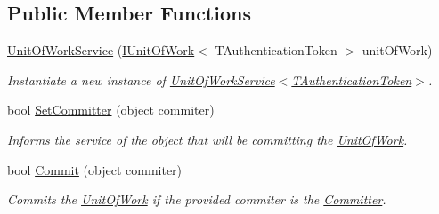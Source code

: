 \subsection*{Public Member Functions}
\begin{DoxyCompactItemize}
\item 
\hyperlink{classCqrs_1_1Services_1_1UnitOfWorkService_a187b3f612490a8316770bb7c6a9aa25f_a187b3f612490a8316770bb7c6a9aa25f}{Unit\+Of\+Work\+Service} (\hyperlink{interfaceCqrs_1_1Domain_1_1IUnitOfWork}{I\+Unit\+Of\+Work}$<$ T\+Authentication\+Token $>$ unit\+Of\+Work)
\begin{DoxyCompactList}\small\item\em Instantiate a new instance of \hyperlink{classCqrs_1_1Services_1_1UnitOfWorkService_a187b3f612490a8316770bb7c6a9aa25f_a187b3f612490a8316770bb7c6a9aa25f}{Unit\+Of\+Work\+Service$<$\+T\+Authentication\+Token$>$}. \end{DoxyCompactList}\item 
bool \hyperlink{classCqrs_1_1Services_1_1UnitOfWorkService_a663471bc62f79df22c800ad683a27f59_a663471bc62f79df22c800ad683a27f59}{Set\+Committer} (object commiter)
\begin{DoxyCompactList}\small\item\em Informs the service of the object that will be committing the \hyperlink{classCqrs_1_1Services_1_1UnitOfWorkService_a1ba76512e37e5006c2b65d071803e99f_a1ba76512e37e5006c2b65d071803e99f}{Unit\+Of\+Work}. \end{DoxyCompactList}\item 
bool \hyperlink{classCqrs_1_1Services_1_1UnitOfWorkService_a3291740821150ecea174820ed27ee56c_a3291740821150ecea174820ed27ee56c}{Commit} (object commiter)
\begin{DoxyCompactList}\small\item\em Commits the \hyperlink{classCqrs_1_1Services_1_1UnitOfWorkService_a1ba76512e37e5006c2b65d071803e99f_a1ba76512e37e5006c2b65d071803e99f}{Unit\+Of\+Work} if the provided {\itshape commiter}  is the \hyperlink{classCqrs_1_1Services_1_1UnitOfWorkService_aabeccb6ba949fe02b8676b324f85950b_aabeccb6ba949fe02b8676b324f85950b}{Committer}. \end{DoxyCompactList}\end{DoxyCompactItemize}
